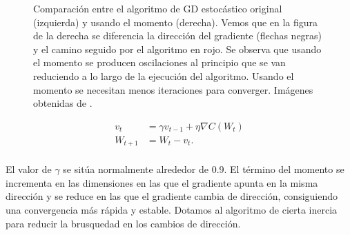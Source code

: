 \begin{figure}[!tbp]

  \centering
  \hfill
  \caption[Comparación entre el algoritmo de gradiente descendente estocástico original y usando el momento]{Comparación entre el algoritmo de GD estocástico original (izquierda) y usando el momento (derecha). Vemos que en la figura de la derecha se diferencia la dirección del gradiente (flechas negras) y el camino seguido por el algoritmo en rojo. Se observa que usando el momento se producen oscilaciones al principio que se van reduciendo a lo largo de la ejecución del algoritmo. Usando el momento se necesitan menos iteraciones para converger. Imágenes obtenidas de \cite{GoodFellowBook}.}
    \label{fig:momentum}
\end{figure}

\begin{align*}	
	v_t&= \gamma v_{t-1} + \eta \nabla C(W_t) \\
	W_{t+1} &= W_t- v_t. \\
\end{align*}

El valor de $\gamma$ se sitúa normalmente alrededor de 0.9. El término del momento se incrementa en las dimensiones en las que el gradiente apunta en la misma dirección y se reduce en las que el gradiente cambia de dirección, consiguiendo una convergencia más rápida y estable. Dotamos al algoritmo de cierta inercia para reducir la brusquedad en los cambios de dirección.

